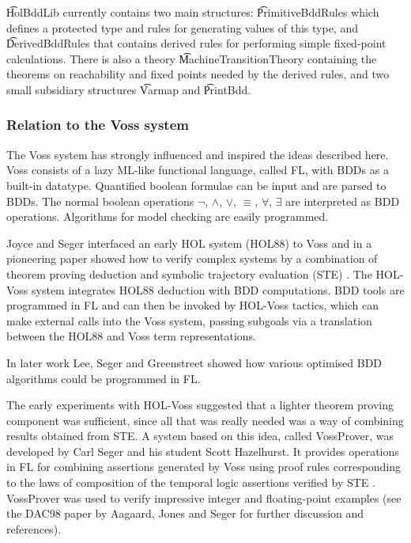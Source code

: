 \t{HolBddLib} currently contains two main structures: \t{PrimitiveBddRules}
which defines a protected type \termbddty and rules for generating
values of this type, and \t{DerivedBddRules} that contains derived
rules for performing simple fixed-point calculations.  There is also a
theory \t{MachineTransitionTheory} containing the theorems on
reachability and fixed points needed by the derived rules,
and two small subsidiary structures \t{Varmap} and \t{PrintBdd}.


\subsubsection{Relation to the Voss system}\label{related}

The Voss system \cite{SegerVoss} has strongly influenced and inspired
the ideas described here. Voss consists of a lazy
ML-like functional language, called FL, with BDDs as a built-in datatype.
Quantified boolean formulae can be input and are parsed to BDDs.
The normal boolean operations $\neg$, $\wedge$, $\vee$, $\equiv$,
$\forall$, $\exists$ are interpreted as BDD operations.  
Algorithms for model checking are easily programmed.

Joyce and Seger interfaced an early HOL system (HOL88) to Voss and in
a pioneering paper showed how to verify complex systems by a
combination of theorem proving deduction and symbolic trajectory
evaluation (STE) \cite{JoyceSeger}. The HOL-Voss system integrates HOL88
deduction with BDD computations.  BDD tools are programmed in FL and
can then be invoked by HOL-Voss tactics, which can make external
calls into the Voss system, passing subgoals via a translation between
the HOL88 and Voss term representations.

In later work Lee, Seger and Greenstreet \cite{LeeGreenstreetSeger}
showed how various optimised BDD algorithms could be programmed in FL.

The early experiments with HOL-Voss suggested that a lighter theorem
proving component was sufficient, since all that was really needed was
a way of combining results obtained from STE. A system based on this
idea, called VossProver, was developed by Carl Seger and his student
Scott Hazelhurst. It provides operations in FL for combining
assertions generated by Voss using proof rules corresponding to the
laws of composition of the temporal logic assertions verified by STE
\cite{hazelhurst-kropfbook-97}.  
VossProver was used to verify
impressive integer and floating-point examples (see the DAC98
paper by Aagaard, Jones and Seger \cite{aagaard-dac-98} for further
discussion and references). 

